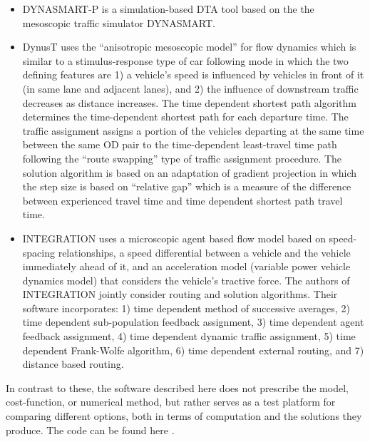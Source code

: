 \begin{itemize}
\item DYNASMART-P \cite{DYNASMART,mahmassani2004dynasmart} is a simulation-based DTA tool based on the the mesoscopic traffic simulator DYNASMART. 
\item DynusT \cite{chiu2011dynust} uses the “anisotropic mesoscopic model” for flow dynamics which is similar to a stimulus-response type of car following mode in which the two defining features are 1) a vehicle’s speed is influenced by vehicles in front of it (in same lane and adjacent lanes), and 2) the influence of downstream traffic decreases as distance increases. The time dependent shortest path algorithm determines the time-dependent shortest path for each departure time. The traffic assignment assigns a portion of the vehicles departing at the same time between the same OD pair to the time-dependent least-travel time path following the “route swapping” type of traffic assignment procedure. The solution algorithm is based on an adaptation of gradient projection in which the step size is based on “relative gap” which is a measure of the difference between experienced travel time and time dependent shortest path travel time. 
\item INTEGRATION \cite{rakha2012integration} uses a microscopic agent based flow model based on speed-spacing relationships, a speed differential between a vehicle and the vehicle immediately ahead of it, and an acceleration model (variable power vehicle dynamics model) that considers the vehicle’s tractive force. The authors of INTEGRATION jointly consider routing and solution algorithms. Their software incorporates: 1) time dependent method of successive averages, 2) time dependent sub-population feedback assignment, 3) time dependent agent feedback assignment, 4) time dependent dynamic traffic assignment, 5) time dependent Frank-Wolfe algorithm, 6) time dependent external routing, and 7) distance based routing.  

\end{itemize}

In contrast to these, the software described here does not prescribe the model, cost-function, or numerical method, but rather serves as a test platform for comparing different options, both in terms of computation and the solutions they produce. The code can be found here \cite{ta_solver}.




